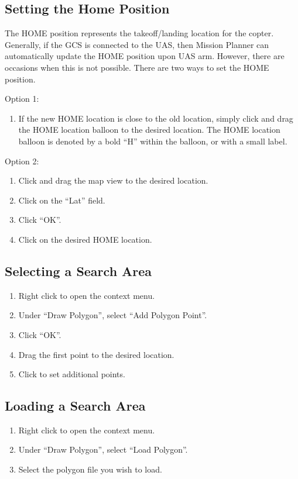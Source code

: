 \documentclass{report}
\begin{document}
		\subsection{Setting the Home Position}
			The HOME position represents the takeoff/landing location for the copter.  Generally, if the \gls{GCS} is connected to the \gls{UAS}, then Mission Planner can automatically update the HOME position upon \gls{UAS} arm.  However, there are occasions when this is not possible.  There are two ways to set the HOME position.

			Option 1:
			\begin{enumerate}
				\item If the new HOME location is close to the old location, simply click and drag the HOME location balloon to the desired location.  The HOME location balloon is denoted by a bold ``H'' within the balloon, or with a small label.
			\end{enumerate}

			Option 2:
			\begin{enumerate}
				\item Click and drag the map view to the desired location.
				\item Click on the ``Lat'' field.
				\item Click ``OK''.
				\item Click on the desired HOME location.
			\end{enumerate}
		\subsection{Selecting a Search Area}
			\begin{enumerate}
				\item Right click to open the context menu.
				\item Under ``Draw Polygon'', select ``Add Polygon Point''.
				\item Click ``OK''.
				\item Drag the first point to the desired location.
				\item Click to set additional points.
			\end{enumerate}
		\subsection{Loading a Search Area}
			\begin{enumerate}
				\item Right click to open the context menu.
				\item Under ``Draw Polygon'', select ``Load Polygon''.
				\item Select the polygon file you wish to load.
			\end{enumerate}
\end{document}

